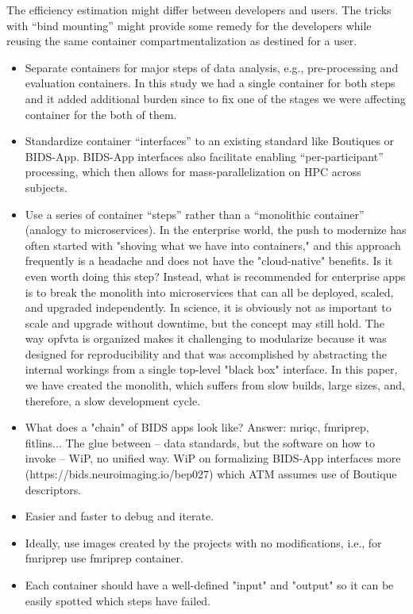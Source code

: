 \begin{itemize}
    The efficiency estimation might differ between developers and users.
    The tricks with ``bind mounting'' might provide some remedy for the developers while reusing the same container compartmentalization as destined for a user.
    \begin{itemize}
    \item
      Separate containers for major steps of data analysis, e.g., pre-processing and evaluation containers.
      In this study we had a single container for both steps and it added additional burden since to fix one of the stages we were affecting container for the both of them. 
    \item
      Standardize container ``interfaces'' to an existing standard like Boutiques or BIDS-App.
      BIDS-App interfaces also facilitate enabling ``per-participant'' processing, which then allows for mass-parallelization on HPC across subjects.
    \item
      Use a series of container ``steps'' rather than a ``monolithic container'' (analogy to microservices).
      In the enterprise world, the push to modernize has often started with "shoving what we have into containers," and this approach frequently is a headache and does not have the "cloud-native" benefits. Is it even worth doing this step?
      Instead, what is recommended for enterprise apps is to break the monolith into microservices that can all be deployed, scaled, and upgraded independently.
      In science, it is obviously not as important to scale and upgrade without downtime, but the concept may still hold.
      The way opfvta is organized makes it challenging to modularize because it was designed for reproducibility and that was accomplished by abstracting the internal workings from a single top-level "black box" interface.
      In this paper, we have created the monolith, which suffers from slow builds, large sizes, and, therefore, a slow development cycle.
      \item What does a "chain" of BIDS apps look like?  Answer: mriqc, fmriprep, fitlins... The glue between -- data standards, but the software on how to invoke -- WiP, no unified way. WiP on formalizing BIDS-App interfaces more (https://bids.neuroimaging.io/bep027) which ATM assumes use of Boutique descriptors.
      \item Easier and faster to debug and iterate.
      \item Ideally, use images created by the projects with no modifications, i.e., for fmriprep use fmriprep container.
      \item Each container should have a well-defined "input" and "output" so it can be easily spotted which steps have failed.
    \end{itemize}
  

\end{itemize}

